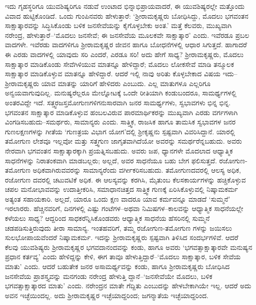 ಇದು ಗೃಹಸ್ಥರಿಗೂ ಯುವಶಿಷ್ಯರಿಗೂ ನಡುವೆ ಉಂಟಾದ ಭಿನ್ನಾಭಿಪ್ರಾಯವಾದರೆ, ಈ ಯುವಶಿಷ್ಯರಲ್ಲೇ ಮತ್ತೊಂದು ವಿವಾದ ಹುಟ್ಟಿಕೊಂಡಿದೆ. ಒಂದು ಗುಂಪಿನವರು ಹೇಳುತ್ತಾರೆ: ‘ಶ್ರೀರಾಮಕೃಷ್ಣರು ಬೋಧಿಸಿದ್ದು, ಮೊದಲು ಭಗವಂತನ ಸಾಕ್ಷಾತ್ಕಾರವನ್ನು ಸಿದ್ಧಿಸಿಕೊಂಡು ಬಳಿಕ ಜನಸೇವೆಯನ್ನು ಕೈಗೊಳ್ಳಬೇಕು ಅಂತ.’ ಮತ್ತೆ ಕೆಲವರು, ಮುಖ್ಯವಾಗಿ ನರೇಂದ್ರ, ಹೇಳುತ್ತಾರೆ–‘ಮೊದಲು ಜನಸೇವೆ; ಈ ಜನಸೇವೆಯ ಮೂಲಕವೇ ಸಾಕ್ಷಾತ್ಕಾರ’ ಎಂದು. ಇವೆರಡೂ ಪ್ರಬಲ ವಾದಗಳೇ. ಇವೆರಡು ವಾದಗಳಿಗೂ ಶ್ರೀರಾಮಕೃಷ್ಣರ ಜೀವನ ಹಾಗೂ ಬೋಧನೆಗಳಲ್ಲಿ ಆಧಾರ ಸಿಗುತ್ತದೆ. ಹಾಗಾದರೆ ಈ ಎರಡು ವಾದಗಳಲ್ಲಿ ಯಾವುದು ಸರಿ ಎಂದರೆ, ಎರಡೂ ಸರಿ! ಅದು ಹೇಗೆ ಸಾಧ್ಯ? ಶ್ರೀರಾಮಕೃಷ್ಣರು, ಮೊದಲು ಸಾಕ್ಷಾತ್ಕಾರ ಮಾಡಿಕೊಂಡು ಸೇವೆಗಿಳಿಯುವ ಮಾತನ್ನೂ ಹೇಳಿದ್ದಾರೆ; ಮೊದಲು ಲೋಕಸೇವೆ ಮಾಡಿ ತನ್ಮೂಲಕ ಸಾಕ್ಷಾತ್ಕಾರ ಮಾಡಿಕೊಳ್ಳುವ ಮಾತನ್ನೂ ಹೇಳಿದ್ದಾರೆ. ಆದರೆ ಇಲ್ಲಿ ನಾವು ಅರಿತು ಕೊಳ್ಳಬೇಕಾದ ವಿಷಯ ಇದು–ಶ್ರೀರಾಮಕೃಷ್ಣರು ಯಾವ ಮಾತನ್ನು ಯಾರಿಗೆ ಹೇಳಿದರು ಎಂಬುದು. ಎಲ್ಲ ಮಾತುಗಳೂ ಎಲ್ಲರಿಗೂ ಅನ್ವಯವಾಗುವುದಿಲ್ಲ. ಮನುಷ್ಯರೆಲ್ಲರೂ ಮೇಲ್ನೋಟಕ್ಕೆ ಒಂದೇ ರೀತಿಯಾಗಿ ಕಂಡುಬಂದರೂ, ಸಾಮರ್ಥ್ಯಗಳಲ್ಲಿ ಅಂತರವಿದ್ದೇ ಇದೆ. ಸತ್ತ್ವರಜಸ್ತಮೋಗುಣಗಳಿಗನುಸಾರವಾಗಿ ಜನರ ಸಾಮರ್ಥ್ಯಗಳು, ಸ್ವಭಾವಗಳು ಭಿನ್ನ ಭಿನ್ನ. ಭಗವಂತನ ಸಾಕ್ಷಾತ್ಕಾರ ಮಾಡಿಕೊಳ್ಳುವ ಹಂಬಲವಿರುವ ಪಾರಮಾರ್ಥಿಕರನ್ನು ಮುಖ್ಯವಾಗಿ ಎರಡು ವರ್ಗಗಳಾಗಿ ವಿಂಗಡಿಸಬಹುದು–ಸಮರ್ಥರು, ಸಾಮಾನ್ಯರು ಎಂದು. ಸಾತ್ತ್ವಿಕ, ರಾಜಸಿಕ ಹಾಗೂ ತಾಮಸಿಕ ಸ್ವಭಾವಗಳ ಜನರ ಗುಣಲಕ್ಷಣಗಳನ್ನು ಗೀತೆಯ ‘ಗುಣತ್ರಯ ವಿಭಾಗ ಯೋಗ’ದಲ್ಲಿ ಶ್ರೀಕೃಷ್ಣನು ಸ್ಪಷ್ಟವಾಗಿ ವಿವರಿಸಿದ್ದಾನೆ. ಯಾರಲ್ಲಿ ತಮೋಗುಣ ಲೇಶವೂ ಇಲ್ಲವೋ ಮತ್ತು ಸತ್ತ್ವಗುಣ ಜಾಗೃತವಾಗಿದೆಯೋ ಅವರನ್ನು ಸಮರ್ಥರೆನ್ನಬಹುದು. ಅವರು ನೇರವಾಗಿ ಭಗವಂತನ ಸಾಕ್ಷಾತ್ಕಾರಕ್ಕಾಗಿ ಪ್ರಯತ್ನಿಸಬಹುದು. ಅವರು ಜಪ, ಧ್ಯಾನಗಳೇ ಮೊದಲಾದ ಆಧ್ಯಾತ್ಮಿಕ ಸಾಧನೆಗಳನ್ನು ನಿರಾತಂಕವಾಗಿ ಮಾಡಬಲ್ಲರು; ಅಲ್ಲದೆ, ಅವರ ಸಾಧನೆಯೂ ಬಹು ಬೇಗ ಫಲಿಸುತ್ತದೆ. ರಜೋಗುಣ-ತಮೋಗುಣ ಅಧಿಕವಾಗಿರುವವರನ್ನು ಸಾಮಾನ್ಯರೆಂದು ವರ್ಗೀಕರಿಸಬಹುದು. ತಮೋಗುಣದವರಲ್ಲಿ ಆಲಸ್ಯ ಅಧಿಕ, ರಜೋಗುಣ ದವರಲ್ಲಿ ಚಟುವಟಿಕೆ ಅಧಿಕ. ಈ ಆಲಸ್ಯವನ್ನು ಕರಗಿಸಿ, ಮೈತುಂಬ ಕೆಲಸಕಾರ್ಯಗಳನ್ನು ಹಚ್ಚಿಕೊಳ್ಳುವ ಚಪಲ ಮನೋಭಾವವನ್ನು ಉದಾತ್ತೀಕರಿಸಿ, ಸಮಾಧಾನಚಿತ್ತದ ಸಾತ್ತ್ವಿಕ ಗುಣಕ್ಕೆ ಏರಿಸಿಕೊಳ್ಳುವಲ್ಲಿ ನಿಷ್ಕಾಮಕರ್ಮ ಅತ್ಯಂತ ಸಹಾಯಕಾರಿ. ಅಲ್ಲದೆ, ಯಾರೂ ಒಂದು ಕ್ಷಣ ವಾದರೂ ಯಾವ ಕರ್ಮವನ್ನೂ ಮಾಡದೆ ‘ಸುಮ್ಮನೆ’ ಇರಲಾರರು. ಹೆಚ್ಚಿನವರಿಗೆ, ದಿನಗಳಲ್ಲಿ ಎಷ್ಟು ಗಂಟೆಗಳ–ಅಥವಾ ನಿಮಿಷಗಳ–ಕಾಲವನ್ನು ಆಧ್ಯಾತ್ಮಿಕ ಸಾಧನೆಯಲ್ಲೇ ಕಳೆಯಲು ಸಾಧ್ಯ? ಆದ್ದರಿಂದ ಸಾಧಕರೆನ್ನಿಸಿಕೊಂಡವರು ಆಧ್ಯಾತ್ಮಿಕ ಸಾಧನೆಯ ಹೆಸರಿನಲ್ಲಿ ಸುಮ್ಮನೆ ಚಡಪಡಿಸುತ್ತಿರುವುದು ತೀರಾ ಸಾಮಾನ್ಯ. ಇಂತಹವರಿಗೆ, ತಮ್ಮ ರಜೋಗುಣ-ತಮೋಗುಣ ಗಳನ್ನು ಜಯಿಸಲು ಸುಲಭೋಪಾಯವೆಂದರೆ ನಿಷ್ಕಾಮಕರ್ಮ. ಇದನ್ನು ಶ್ರೀರಾಮಕೃಷ್ಣರು ಸ್ಪಷ್ಟವಾಗಿ ತಿಳಿಸಿದ ಸಂದರ್ಭಗಳಿವೆ. ಆದರೆ ಕೆಲವು ಯುವಶಿಷ್ಯರು ಶ್ರೀರಾಮಕೃಷ್ಣರ ಭಗವದಾನಂದವನ್ನು ಕಂಡು, ಹಾಗೂ ಅವರು ‘ಭಗವತ್ಸಾಕ್ಷಾತ್ಕಾರವೇ ಮನುಷ್ಯನ ಪ್ರಧಾನ ಕರ್ತವ್ಯ’ ಎಂದು ಹೇಳಿದ್ದನ್ನು ಕೇಳಿ, ಈಗ ತಾವೂ ಹೇಳುತ್ತಿದ್ದಾರೆ–‘ಮೊದಲು ಸಾಕ್ಷಾತ್ಕಾರ, ಬಳಿಕ ಸೇವೆಯ ಮಾತು’ ಎಂದು. ಆದರೆ ಬಹುತೇಕ ಜನರ ಅಸಾಮರ್ಥ್ಯವನ್ನು ಕಂಡು, ಹಾಗೂ ಶ್ರೀರಾಮಕೃಷ್ಣರು ಬೋಧಿಸಿದ ಜನಸೇವೆಯ ಪ್ರಾಶಸ್ತ್ಯವನ್ನು ಮನಗಂಡು ನರೇಂದ್ರ ಹೇಳುತ್ತಿ ದ್ದಾನೆ–‘ಜನಸೇವೆಯೇ ಮೊದಲು, ಬಳಿಕ ಭಗವತ್ಸಾಕ್ಷಾತ್ಕಾರದ ಮಾತು’ ಎಂದು. ನರೇಂದ್ರನ ಮಾತೇ ಗೆದ್ದಿತು ಎಂಬುದನ್ನು ಹೇಳಬೇಕಾಗಿಯೇ ಇಲ್ಲ. ಆದರೆ ಅದು ಅವನ ಇಚ್ಛೆಯಿಂದಲ್ಲ. ಅದು ಶ್ರೀರಾಮಕೃಷ್ಣರ ಇಚ್ಛೆಯಾದ್ದರಿಂದ; ಜಗನ್ಮಾತೆಯ ಇಚ್ಛೆಯಾದ್ದರಿಂದ.


